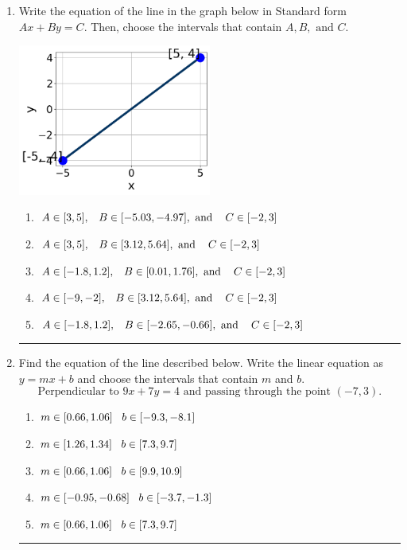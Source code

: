 \documentclass[14pt]{extbook}
\newcommand{\litem}[1]{\item#1\hspace*{-1cm}\rule{\textwidth}{0.4pt}}
\begin{document}
\begin{enumerate}
\litem{
Write the equation of the line in the graph below in Standard form $Ax+By=C$. Then, choose the intervals that contain $A, B, \text{ and } C$.
\begin{center}
    \includegraphics[width=0.5\textwidth]{../Figures/linearGraphToStandardB.png}
\end{center}
\begin{enumerate}[label=\Alph*.]
\item \( A \in [3, 5], \hspace{3mm} B \in [-5.03, -4.97], \text{ and } \hspace{3mm} C \in [-2, 3] \)
\item \( A \in [3, 5], \hspace{3mm} B \in [3.12, 5.64], \text{ and } \hspace{3mm} C \in [-2, 3] \)
\item \( A \in [-1.8, 1.2], \hspace{3mm} B \in [0.01, 1.76], \text{ and } \hspace{3mm} C \in [-2, 3] \)
\item \( A \in [-9, -2], \hspace{3mm} B \in [3.12, 5.64], \text{ and } \hspace{3mm} C \in [-2, 3] \)
\item \( A \in [-1.8, 1.2], \hspace{3mm} B \in [-2.65, -0.66], \text{ and } \hspace{3mm} C \in [-2, 3] \)

\end{enumerate} }
\litem{
Find the equation of the line described below. Write the linear equation as $ y=mx+b $ and choose the intervals that contain $m$ and $b$.\[ \text{Perpendicular to } 9 x + 7 y = 4 \text{ and passing through the point } (-7, 3). \]\begin{enumerate}[label=\Alph*.]
\item \( m \in [0.66, 1.06] \hspace*{3mm} b \in [-9.3, -8.1] \)
\item \( m \in [1.26, 1.34] \hspace*{3mm} b \in [7.3, 9.7] \)
\item \( m \in [0.66, 1.06] \hspace*{3mm} b \in [9.9, 10.9] \)
\item \( m \in [-0.95, -0.68] \hspace*{3mm} b \in [-3.7, -1.3] \)
\item \( m \in [0.66, 1.06] \hspace*{3mm} b \in [7.3, 9.7] \)


\end{enumerate}}
\end{enumerate}
\end{document}
